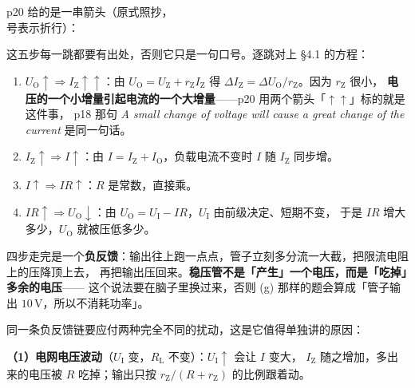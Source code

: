 \documentclass[11pt]{ctexart}
\renewcommand{\subhdr}[1]{%
  \par\vspace{6pt}%
  \noindent{\color{violet}\bfseries #1}\par\nopagebreak[4]\vspace{1pt}}
\begin{document}
p20 给的是一串箭头（原式照抄，\\ 号表示折行）：


这五步每一跳都要有出处，否则它只是一句口号。逐跳对上 §4.1 的方程：

\begin{enumerate}
\item $U_{\mathrm{O}}\uparrow\Rightarrow I_{\mathrm{Z}}\uparrow\uparrow$：由 $U_{\mathrm{O}}=U_{\mathrm{Z}}+r_{\mathrm{Z}}I_{\mathrm{Z}}$
得 $\Delta I_{\mathrm{Z}}=\Delta U_{\mathrm{O}}/r_{\mathrm{Z}}$。因为 $r_{\mathrm{Z}}$ 很小，
\textbf{电压的一个小增量引起电流的一个大增量}——p20 用两个箭头「$\uparrow\uparrow$」标的就是这件事，
p18 那句 \emph{A small change of voltage will cause a great change of the current} 是同一句话。
\item $I_{\mathrm{Z}}\uparrow\Rightarrow I\uparrow$：由 $I=I_{\mathrm{Z}}+I_{\mathrm{O}}$，负载电流不变时 $I$ 随 $I_{\mathrm{Z}}$ 同步增。
\item $I\uparrow\Rightarrow IR\uparrow$：$R$ 是常数，直接乘。
\item $IR\uparrow\Rightarrow U_{\mathrm{O}}\downarrow$：由 $U_{\mathrm{O}}=U_{\mathrm{I}}-IR$，$U_{\mathrm{I}}$ 由前级决定、短期不变，
于是 $IR$ 增大多少，$U_{\mathrm{O}}$ 就被压低多少。
\end{enumerate}

四步走完是一个\textbf{负反馈}：输出往上跑一点点，管子立刻多分流一大截，把限流电阻上的压降顶上去，
再把输出压回来。\textbf{稳压管不是「产生」一个电压，而是「吃掉」多余的电压}——
这个说法要在脑子里换过来，否则 (g) 那样的题会算成「管子输出 $10\,\mathrm{V}$，所以不消耗功率」。


\subhdr{4.3 两种扰动，一条链能同时管住}

同一条负反馈链要应付两种完全不同的扰动，这是它值得单独讲的原因：

\textbf{（1）电网电压波动}（$U_{\mathrm{I}}$ 变，$R_{\mathrm{L}}$ 不变）：$U_{\mathrm{I}}\uparrow$ 会让 $I$ 变大，
$I_{\mathrm{Z}}$ 随之增加，多出来的电压被 $R$ 吃掉；输出只按 $r_{\mathrm{Z}}/(R+r_{\mathrm{Z}})$ 的比例跟着动。
\end{document}
